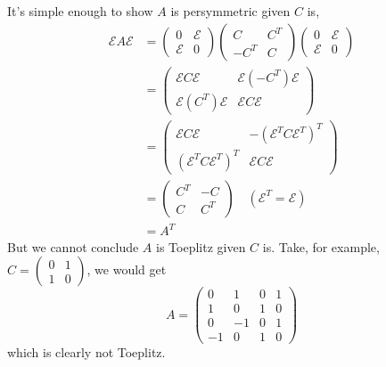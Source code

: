 \documentclass[11pt]{article}
\newcommand{\Eps}{\mathcal{E}}
\begin{document}
\begin{enumerate}
\begin{enumerate}[label=(\alph*)]
		            It's simple enough to show \(A\) is persymmetric given \(C\) is,
		            \begin{align*}
			            \Eps A \Eps & =
			            \begin{pmatrix} 0 & \Eps \\ \Eps & 0 \end{pmatrix}
			            \begin{pmatrix} C & C^T \\ -C^T & C \end{pmatrix}
			            \begin{pmatrix} 0 & \Eps \\ \Eps & 0 \end{pmatrix}
			            \\
			                        & =
			            \begin{pmatrix}
				            \Eps C \Eps & \Eps (-C^T) \Eps \\ \Eps (C^T) \Eps & \Eps C \Eps
			            \end{pmatrix}
			            \\
			                        & =
			            \begin{pmatrix}
				            \Eps C \Eps & -(\Eps^T C \Eps^T)^T \\ (\Eps^T C \Eps^T)^T & \Eps C \Eps
			            \end{pmatrix}
			            \\
			                        & =
			            \begin{pmatrix}
				            C^T & -C \\ C & C^T
			            \end{pmatrix} \quad (\Eps^T = \Eps)
			            \\
			                        & = A^T
		            \end{align*}
		            But we cannot conclude \(A\) is Toeplitz given \(C\) is.  Take, for example, \(C = \begin{pmatrix}  0 & 1 \\ 1 & 0 \end{pmatrix}\), we would get \[A = \begin{pmatrix} 0 & 1 & 0 & 1 \\ 1 & 0 & 1 & 0 \\ 0 & -1 & 0 & 1 \\ -1 & 0 & 1 & 0  \end{pmatrix}\]
		            which is clearly not Toeplitz.
	      \end{enumerate}


\end{enumerate}
\end{document}
